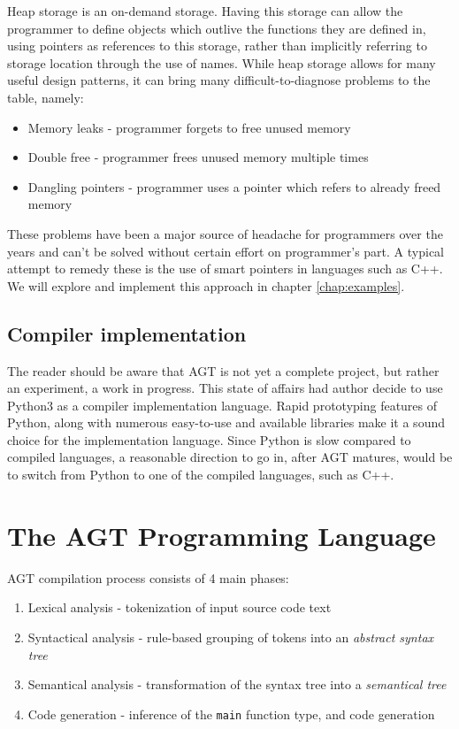 \documentclass[times, utf8, diplomski]{fer}
\theoremstyle{definition}
\begin{document}
Heap storage is an on-demand storage. Having this storage can allow the programmer to define
objects which outlive the functions they are defined in, using pointers as references to this storage,
rather than implicitly referring to storage location through the use of names.
While heap storage allows for many useful design patterns, it can bring many difficult-to-diagnose
problems to the table, namely:

\begin{itemize}
    \item Memory leaks - programmer forgets to free unused memory
    \item Double free - programmer frees unused memory multiple times
    \item Dangling pointers - programmer uses a pointer which refers to already freed memory
\end{itemize}

These problems have been a major source of headache for programmers over the years and can't be solved
without certain effort on programmer's part. A typical attempt to remedy these is the use of 
smart pointers in languages such as C++. We will explore and implement this approach in 
chapter \ref{chap:examples}.

\section{Compiler implementation}

The reader should be aware that AGT is not yet a complete project, but rather an experiment, 
a work in progress. This state of affairs had author decide to use Python3 as a compiler implementation
language. Rapid prototyping features of Python, along with numerous easy-to-use and available libraries
make it a sound choice for the implementation language. Since Python is slow compared to compiled
languages, a reasonable direction to go in, after AGT matures, would be to switch from Python
to one of the compiled languages, such as C++.

\chapter{The AGT Programming Language}\label{chap:indepth}

AGT compilation process consists of 4 main phases: 

\begin{enumerate}
\item Lexical analysis - tokenization of input source code text
\item Syntactical analysis - rule-based grouping of tokens into an \textit{abstract syntax tree}
\item Semantical analysis - transformation of the syntax tree into a \textit{semantical tree}
\item Code generation - inference of the \texttt{main} function type, and code generation
\end{enumerate}
\end{document}
